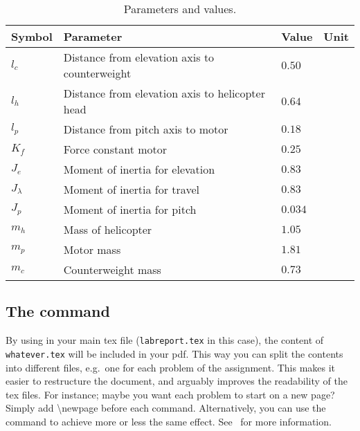 \begin{table}[tbp]
	\centering
	\caption{Parameters and values.}
	\begin{tabular}{llll}
		\toprule
		Symbol & Parameter & Value & Unit \\
		\midrule
		$l_{c}$     & Distance from elevation axis to counterweight   & $0.50$  & \meter                      \\
		$l_{h}$     & Distance from elevation axis to helicopter head & $0.64$  & \meter                      \\
		$l_{p}$     & Distance from pitch axis to motor               & $0.18$  & \meter                      \\
		$K_f$       & Force constant motor                            & $0.25$  & \newton\per\volt            \\
		$J_e$       & Moment of inertia for elevation                 & $0.83$  & \kilogram\usk\meter\squared \\
		$J_\lambda$ & Moment of inertia for travel                    & $0.83$  & \kilogram\usk\meter\squared \\
		$J_p$       & Moment of inertia for pitch                     & $0.034$ & \kilogram\usk\meter\squared \\
		$m_h$       & Mass of helicopter                              & $1.05$  & \kilogram                   \\
		$m_{p}$     & Motor mass                                      & $1.81$  & \kilogram                   \\
  		$m_{c}$     & Counterweight mass                              & $0.73$  & \kilogram                   \\
		\bottomrule
	\end{tabular}
\label{tab:parameters}
\end{table}

\subsection{The  command}
By using  in your main tex file (\texttt{labreport.tex} in this case), the content of \texttt{whatever.tex} will be included in your pdf. This way you can split the contents into different files, e.g.~one for each problem of the assignment. This makes it easier to restructure the document, and arguably improves the readability of the tex files. For instance; maybe you want each problem to start on a new page? Simply add \textbackslash{newpage} before each  command. Alternatively, you can use the  command to achieve more or less the same effect. See~\cite{InputVsInclude} for more information.

